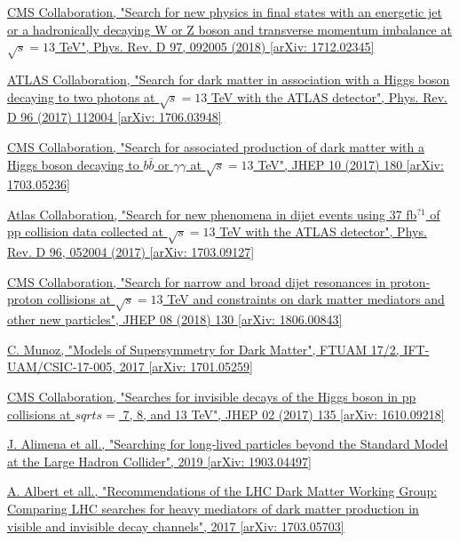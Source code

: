 \documentclass[a4paper, 10pt, openright]{report}
\begin{document}
\begin{thebibliography}{1}
\href{https://arxiv.org/abs/1712.02345}{CMS Collaboration,
"Search for new physics in final states with an energetic jet or a hadronically decaying W or Z boson and transverse momentum imbalance at $\sqrt{s} = 13$ TeV",
Phys. Rev. D 97, 092005 (2018) [arXiv: 1712.02345]
}

\href{https://arxiv.org/abs/1706.03948}{ATLAS Collaboration,
"Search for dark matter in association with a Higgs boson decaying to two photons at $\sqrt{s} = 13$ TeV with the ATLAS detector",
Phys. Rev. D 96 (2017) 112004 [arXiv: 1706.03948]
}

\href{https://arxiv.org/abs/1703.05236}{CMS Collaboration,
"Search for associated production of dark matter with a Higgs boson decaying to $b \bar b$ or $\gamma \gamma$ at $\sqrt{s} = 13$ TeV",
JHEP 10 (2017) 180 [arXiv: 1703.05236]
}

\href{https://arxiv.org/abs/1703.09127}{Atlas Collaboration,
"Search for new phenomena in dijet events using 37 fb$^{?1}$ of pp collision data collected at $\sqrt{s} = 13$ TeV with the ATLAS detector",
Phys. Rev. D 96, 052004 (2017) [arXiv: 1703.09127]
}

\href{https://arxiv.org/abs/1806.00843}{CMS Collaboration,
"Search for narrow and broad dijet resonances in proton-proton collisions at $\sqrt{s} = 13$ TeV and constraints on dark matter mediators and other new particles",
JHEP 08 (2018) 130 [arXiv: 1806.00843]
}

\href{https://arxiv.org/abs/1701.05259}{C. Munoz,
"Models of Supersymmetry for Dark Matter",
FTUAM 17/2, IFT-UAM/CSIC-17-005, 2017 [arXiv: 1701.05259]
}

\href{https://arxiv.org/abs/1610.09218}{CMS Collaboration,
"Searches for invisible decays of the Higgs boson in pp collisions at $sqrt{s} =$ 7, 8, and 13 TeV",
JHEP 02 (2017) 135 [arXiv: 1610.09218]
}

\href{https://arxiv.org/abs/1903.04497?}{J. Alimena et all.,
"Searching for long-lived particles beyond the Standard Model at the Large Hadron Collider",
2019 [arXiv: 1903.04497]
}

\href{https://arxiv.org/abs/1703.05703}{A. Albert et all.,
"Recommendations of the LHC Dark Matter Working Group: Comparing LHC searches for heavy mediators of dark matter production in visible and invisible decay channels",
2017 [arXiv: 1703.05703]
}


\end{thebibliography}
\end{document}
